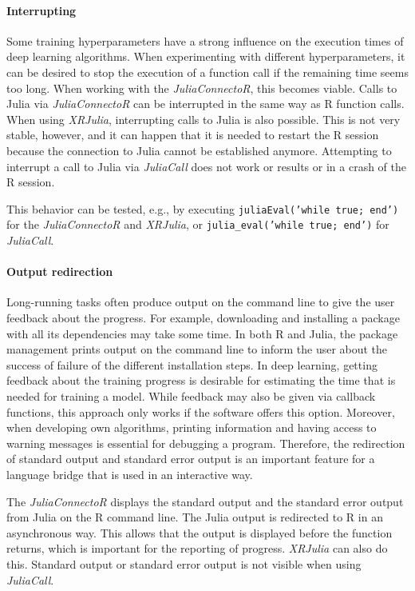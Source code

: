 \documentclass[12pt]{article}
\newcommand{\inlinecode}[1]{\texttt{#1}}
\newcommand{\apkg}[1]{\emph{#1}}
\begin{document}
\paragraph{Interrupting}\label{juliaconnectorinterrupting}

Some training hyperparameters have a strong influence on the execution times of deep learning algorithms.
When experimenting with different hyperparameters, it can be desired to stop the execution of a function call if the remaining time seems too long.
When working with the \apkg{JuliaConnectoR}, this becomes viable.
Calls to Julia via \apkg{JuliaConnectoR} can be interrupted in the same way as R function calls.
When using \apkg{XRJulia}, interrupting calls to Julia is also possible.
This is not very stable, however, and it can happen that it is needed to restart the R session because the connection to Julia cannot be established anymore.
Attempting to interrupt a call to Julia via \apkg{JuliaCall} does not work or results or in a crash of the R session.

This behavior can be tested, e.g., by executing \inlinecode{juliaEval('while true; end')} for the \apkg{JuliaConnectoR} and \apkg{XRJulia}, or \inlinecode{julia\_eval('while true; end')} for \apkg{JuliaCall}.

\paragraph{Output redirection}\label{juliaconnectorOutput}

Long-running tasks often produce output on the command line to give the user feedback about the progress.
For example, downloading and installing a package with all its dependencies may take some time.
In both R and Julia, the package management prints output on the command line to inform the user about the success of failure of the different installation steps.
In deep learning, getting feedback about the training progress is desirable for estimating the time that is needed for training a model.
While feedback may also be given via callback functions, this approach only works if the software offers this option.
Moreover, when developing own algorithms, printing information and having access to warning messages is essential for debugging a program.
Therefore, the redirection of standard output and standard error output is an important feature for a language bridge that is used in an interactive way.

The \apkg{JuliaConnectoR} displays the standard output and the standard error output from Julia on the R command line.
The Julia output is redirected to R in an asynchronous way.
This allows that the output is displayed before the function returns, which is important for the reporting of progress.
\apkg{XRJulia} can also do this. Standard output or standard error output is not visible when using \apkg{JuliaCall}.
\end{document}
